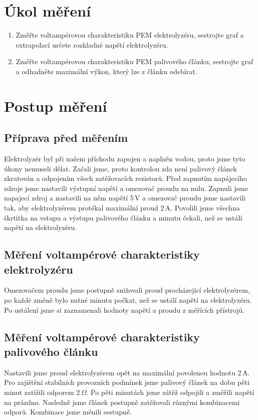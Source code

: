 \documentclass[11pt, a4paper]{report}
\begin{document}

\chapter{Úkol měření}
\begin{enumerate}
	\item Změřte voltampérovou charakteristiku PEM elektrolyzéru, sestrojte graf a extrapolací určete rozkladné napětí elektrolyzéru.
	\item Změřte voltampérovou charakteristiku PEM palivového článku, sestrojte graf a odhadněte maximální výkon, který lze z článku odebírat.
\end{enumerate}

\chapter{Postup měření}
\section{Příprava před měřením}
Elektrolyzér byl při našem příchodu zapojen a naplněn vodou, proto jsme tyto úkony nemuseli dělat.
Začali jsme, proto kontrolou zda není palivový článek zkratován a odpojením všech zatěžovacích rezistorů.
Před zapnutím napájecího zdroje jsme nastavili výstupní napětí a omezovač proudu na nulu.
Zapnuli jsme napajecí zdroj a nastavili na něm napětí 5\,V a omezovač proudu jsme nastavili tak, aby elektrolyzérem protékal maximální proud 2\,A.
Povolili jsme všechna škrtítka na vstupu a výstupu palivového článku a minutu čekali, než se ustálí napětí na elektrolyzéru.

\section{Měření voltampérové charakteristiky elektrolyzéru}
Omezovačem proudu jsme postupně snižovali proud procházející elektrolyzérem, po každé změně bylo nutné minutu počkat, než se ustálí napětí na elektrolyzéru.
Po ustálení jsme si zaznamenali hodnoty napětí a proudu z měřících přístrojů.

\section{Měření voltampérové charakteristiky palivového článku}
Nastavili jsme proud elektrolyzérem opět na maximální povolenou hodnotu 2\,A.
Pro zajištění stabilních provozních podmínek jsme palivový článek na dobu pěti minut zatížili odporem 2\,$\Omega$.
Po pěti minutách jsme zátěž odpojili a změřili napětí na prázdno.
Nasledně jsme článek postupně zatěžovali různými kombinacemi odporů.
Kombinace jsme měnili sestupně.
\end{document}
